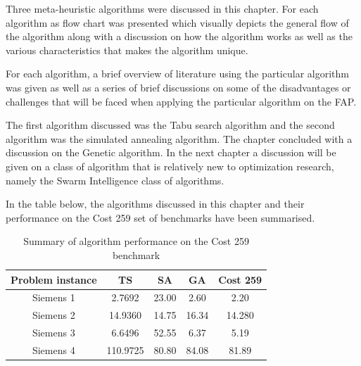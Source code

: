 Three meta-heuristic algorithms were discussed in this chapter. For each algorithm as flow chart was presented which visually depicts the general flow of the algorithm along with a discussion on how the algorithm works as well as the various characteristics that makes the algorithm unique.

For each algorithm, a brief overview of literature using the particular algorithm was given as well as a series of brief discussions on some of the disadvantages or challenges that will be faced when applying the particular algorithm on the FAP.

The first algorithm discussed was the Tabu search algorithm and the second algorithm was the simulated annealing algorithm. The chapter concluded with a discussion on the Genetic algorithm. In the next chapter a discussion will be given on a class of algorithm that is relatively new to optimization research, namely the Swarm Intelligence class of algorithms.

In the table below, the algorithms discussed in this chapter and their performance on the Cost 259 set of benchmarks have been summarised.\\
\begin{table}[h]
\label{tbl:summaryMetaTable}
\begin{center}
	\begin{tabular}{| c | c | c | c | c |}
	\hline
	Problem instance & TS & SA & GA & Cost 259 \\ \hline
	Siemens 1 & 2.7692 & 23.00 & 2.60 & 2.20 \\ \hline
	Siemens 2 & 14.9360 & 14.75 & 16.34 & 14.280 \\ \hline
	Siemens 3 & 6.6496 & 52.55 & 6.37 & 5.19 \\ \hline
	Siemens 4 & 110.9725 & 80.80 & 84.08 & 81.89 \\ \hline
	\end{tabular}
\caption{Summary of algorithm performance on the Cost 259 benchmark}
\end{center}
\end{table}
